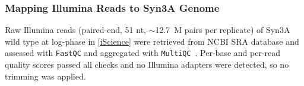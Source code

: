  

\subsubsection{Mapping Illumina Reads to Syn3A Genome}

Raw Illumina reads (paired-end, 51 nt, $\sim$12.7~M pairs per replicate) of Syn3A wild type at log-phase in \ref{iScience} were retrieved from NCBI SRA database and assessed with \texttt{FastQC} and aggregated with \texttt{MultiQC}~\cite{ewels2016multiqc}. Per-base and per-read quality scores passed all checks and no Illumina adapters were detected, so no trimming was applied.



